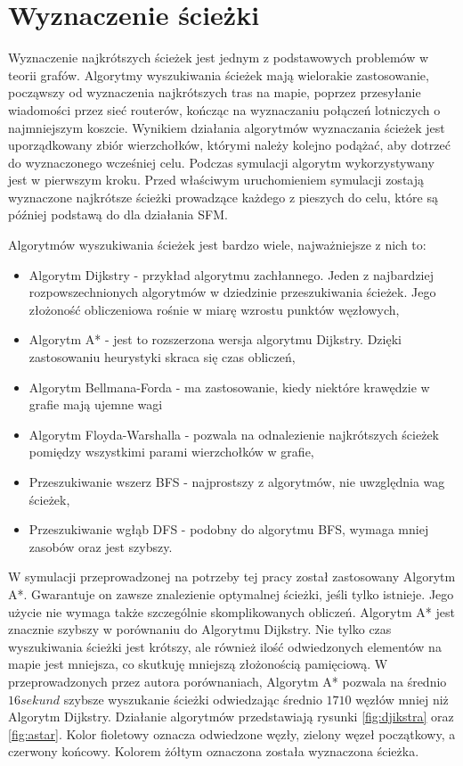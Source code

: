 \chapter{Wyznaczenie ścieżki}
\label{cha:wyznaczenieSciezki}

Wyznaczenie najkrótszych ścieżek jest jednym z podstawowych problemów w teorii grafów. Algorytmy wyszukiwania ścieżek mają wielorakie zastosowanie, począwszy od wyznaczenia najkrótszych tras na mapie, poprzez przesyłanie wiadomości przez sieć routerów, kończąc na wyznaczaniu połączeń lotniczych o najmniejszym koszcie. Wynikiem działania algorytmów wyznaczania ścieżek jest uporządkowany zbiór wierzchołków, którymi należy kolejno podążać, aby dotrzeć do wyznaczonego wcześniej celu. Podczas symulacji algorytm wykorzystywany jest w pierwszym kroku. Przed właściwym uruchomieniem symulacji zostają wyznaczone najkrótsze ścieżki prowadzące każdego z pieszych do celu, które są później podstawą do dla działania SFM.

Algorytmów wyszukiwania ścieżek jest bardzo wiele, najważniejsze z nich to:

\begin{itemize}
\item Algorytm Dijkstry - przykład algorytmu zachłannego. Jeden z najbardziej rozpowszechnionych algorytmów w dziedzinie przeszukiwania ścieżek. Jego złożoność obliczeniowa rośnie w miarę wzrostu punktów węzłowych,
\item Algorytm A* - jest to rozszerzona wersja algorytmu Dijkstry. Dzięki zastosowaniu heurystyki skraca się czas obliczeń,
\item Algorytm Bellmana-Forda - ma zastosowanie, kiedy niektóre krawędzie w grafie mają ujemne wagi
\item Algorytm Floyda-Warshalla - pozwala na odnalezienie najkrótszych ścieżek pomiędzy wszystkimi parami wierzchołków w grafie,
\item Przeszukiwanie wszerz BFS - najprostszy z algorytmów, nie uwzględnia wag ścieżek,
\item Przeszukiwanie wgłąb DFS - podobny do algorytmu BFS, wymaga mniej zasobów oraz jest szybszy.
\end{itemize}

W symulacji przeprowadzonej na potrzeby tej pracy został zastosowany Algorytm A*. Gwarantuje on zawsze znalezienie optymalnej ścieżki, jeśli tylko istnieje. Jego użycie nie wymaga także szczególnie skomplikowanych obliczeń. Algorytm A* jest znacznie szybszy w porównaniu do Algorytmu Dijkstry. Nie tylko czas wyszukiwania ścieżki jest krótszy, ale również ilość odwiedzonych elementów na mapie jest mniejsza, co skutkuję mniejszą złożonością pamięciową. W przeprowadzonych przez autora porównaniach, Algorytm A* pozwala na średnio $16 sekund$ szybsze wyszukanie ścieżki odwiedzając średnio $1710$ węzłów mniej niż Algorytm Dijkstry. Działanie algorytmów przedstawiają rysunki \ref{fig:djikstra} oraz \ref{fig:astar}. Kolor fioletowy oznacza odwiedzone węzły, zielony węzeł początkowy, a czerwony końcowy. Kolorem żółtym oznaczona została wyznaczona ścieżka.

